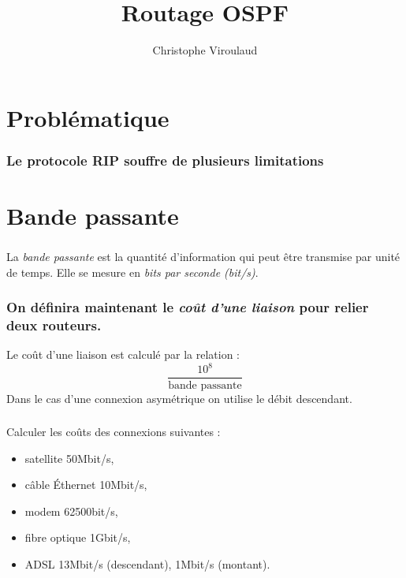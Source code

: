 \documentclass[svgnames,11pt]{beamer}
\author[]{Christophe Viroulaud}
\title{Routage OSPF}
\date{}
\institute{Terminale NSI}
\begin{document}
\begin{frame}
    \titlepage
    \end{frame}

\section{Problématique}
\begin{frame}
    \frametitle{Le protocole RIP souffre de plusieurs limitations}

    \begin{center}
    \end{center}

\end{frame}

\section{Bande passante}

\begin{frame}
    \frametitle{}

    \begin{aretenir}[]
        La \emph{bande passante} est la quantité d'information qui peut être transmise par unité de temps. Elle se mesure en \emph{bits par seconde (bit/s)}.
        \end{aretenir}

\end{frame}

\begin{frame}
    \frametitle{ On définira maintenant le \emph{coût d'une liaison} pour relier deux routeurs.}

    \begin{aretenir}[]
        Le coût d'une liaison est calculé par la relation :
        $$\dfrac{10^8}{\mbox{bande passante}}$$
        Dans le cas d'une connexion asymétrique on utilise le débit descendant.
        \end{aretenir}
\end{frame}


\begin{frame}
    \frametitle{}

    \begin{activite}
        Calculer les coûts des connexions suivantes :
        \begin{itemize}
            \item satellite 50Mbit/s,
            \item câble Éthernet 10Mbit/s,
            \item modem 62500bit/s,
            \item fibre optique 1Gbit/s,
            \item ADSL 13Mbit/s (descendant), 1Mbit/s (montant).
        \end{itemize}
        \end{activite}

\end{frame}
\end{document}
